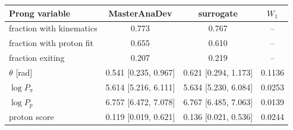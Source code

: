\begin{tabular}{lccc}
\toprule
Prong variable & MasterAnaDev & surrogate & $W_1$ \\
\midrule
fraction with kinematics & 0.773 & 0.767 & -- \\
fraction with proton fit & 0.655 & 0.610 & -- \\
fraction exiting & 0.207 & 0.219 & -- \\
$\theta$ [rad] & 0.541 [0.235, 0.967] & 0.621 [0.294, 1.173] & 0.1136 \\
$\log P_\pi$ & 5.614 [5.216, 6.111] & 5.634 [5.230, 6.084] & 0.0253 \\
$\log P_p$ & 6.757 [6.472, 7.078] & 6.767 [6.485, 7.063] & 0.0139 \\
proton score & 0.119 [0.019, 0.621] & 0.136 [0.021, 0.536] & 0.0244 \\
\bottomrule
\end{tabular}
